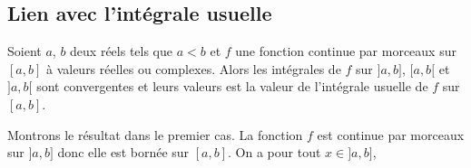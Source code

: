 \documentclass[a4paper,10pt]{report}
\begin{document}
\begin{preuve} 

\vspace{10cm}
\end{preuve}

\subsection{Lien avec l'intégrale \og usuelle \fg}

\begin{prop} Soient $a$, $b$ deux réels tels que $a < b$ et $f$ une fonction continue par morceaux sur $[a,b]$ à valeurs réelles ou complexes. Alors les intégrales de $f$ sur $]a,b]$, $[a,b[$ et $]a,b[$ sont convergentes et leurs valeurs est la valeur de l'intégrale usuelle de $f$ sur $[a,b]$.
\end{prop}

\begin{preuve} Montrons le résultat dans le premier cas. La fonction $f$ est continue par morceaux sur $]a,b]$ donc elle est bornée sur $[a,b]$. On a pour tout $x \in ]a,b]$,


\vspace{6cm}
\end{preuve}
\end{document}
